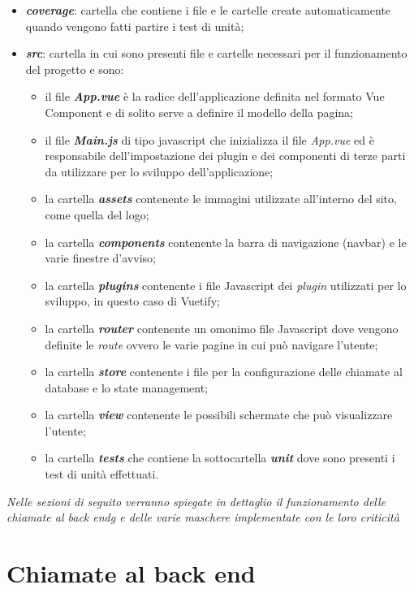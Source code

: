 \begin{itemize}
	\item \textbf{\textit{coverage}}: cartella che contiene i file e le cartelle create automaticamente quando vengono fatti partire i test di unità;
	\item \textbf{\textit{src}}: cartella in cui sono presenti file e cartelle necessari per il funzionamento del progetto e sono:
	\begin{itemize}
		\item il file \textbf{\textit{App.vue}} è la radice dell'applicazione definita nel formato Vue Component e di solito serve a definire il modello della pagina;
		\item il file \textbf{\textit{Main.js}} di tipo javascript che inizializza il file \textit{App.vue} ed è responsabile dell'impostazione dei plugin e dei componenti di terze parti da utilizzare per lo sviluppo dell'applicazione;
		\item la cartella \textbf{\textit{assets}} contenente le immagini utilizzate all'interno del sito, come quella del logo;
		\item la cartella \textbf{\textit{components}} contenente la barra di navigazione (navbar) e le varie finestre d'avviso;
		\item la cartella \textbf{\textit{plugins}} contenente i file Javascript dei \textit{plugin} utilizzati per lo sviluppo, in questo caso di Vuetify;
		\item la cartella \textbf{\textit{router}} contenente un omonimo file Javascript dove vengono definite le \textit{route} ovvero le varie pagine in cui può navigare l'utente;
		\item la cartella \textbf{\textit{store}} contenente i file per la configurazione delle chiamate al database e lo state management;
		\item la cartella \textbf{\textit{view}} contenente le possibili schermate che può visualizzare l'utente;
		\item la cartella \textbf{\textit{tests}} che contiene la sottocartella \textbf{\textit{unit}} dove sono presenti i test di unità effettuati.
	\end{itemize}
\end{itemize}

\textit{Nelle sezioni di seguito verranno spiegate in dettaglio il funzionamento delle chiamate al \gls{back endg} e delle varie maschere implementate con le loro criticità}

\section{Chiamate al back end}
\label{sec:chiamate-back-end}

